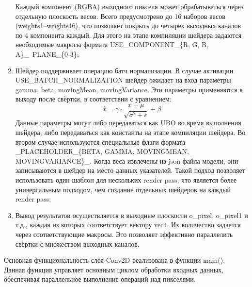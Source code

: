 \documentclass[a4paper,14pt]{extreport}
\begin{document}
\begin{enumerate}
\begin{itemize}
                        
                    \end{itemize}
                Каждый компонент (RGBA) выходного пикселя может обрабатываться через отдельную плоскость весов. Всего предусмотрено до 16 наборов весов (weights1–weights16), что позволяет покрыть до четырех выходных каналов по 4 компонента каждый. Для этого на этапе компиляции шейдера задаются необходимые макросы формата USE\_COMPONENT\_\{R, G, B, A\}\_\ PLANE\_\{0-3\};
                
                \item Шейдер поддерживает операцию батч нормализации. В случае активации USE\_BATCH\_NORMALIZATION шейдер ожидает на вход параметры gamma, beta, movingMean, movingVariance. Эти параметры применяются к выходу после свёртки, в соответствии с уравнением:
                \begin{equation}
                \hat{x} = \gamma \cdot \frac{x - \mu}{\sqrt{\sigma^2 + \epsilon}} + \beta
                \end{equation}
                Данные параметры могут либо передаваться как UBO во время выполнения шейдера, либо передаваться как константы на этапе компиляции шейдера. Во втором случае используются специальные флаги формата \_PLACEHOLDER\_\{BETA, GAMMA, MOVINGMEAN, MOVINGVARIANCE\}\_. Когда веса извлечены из json файла модели, они записываются в шейдер на место данных указателей. Такой подход позволяет использовать один шаблон для нескольких render pass, что является более универсальным подходом, чем создание отдельных шейдеров на каждый render pass;
                
                
                \item Вывод результатов осуществляется в выходные плоскости o\_pixel, o\_pixel1 и т.д., каждая из которых соответствует вектору vec4. Их количество задается через соответствующие макросы. Это позволяет эффективно параллелить свёртки с множеством выходных каналов.
                
            \end{enumerate}
            
            Основная функциональность слоя Conv2D реализована в функции main(). Данная функция управляет основным циклом обработки входных данных, обеспечивая параллельное выполнение операций над пикселями.
    
\end{document}
